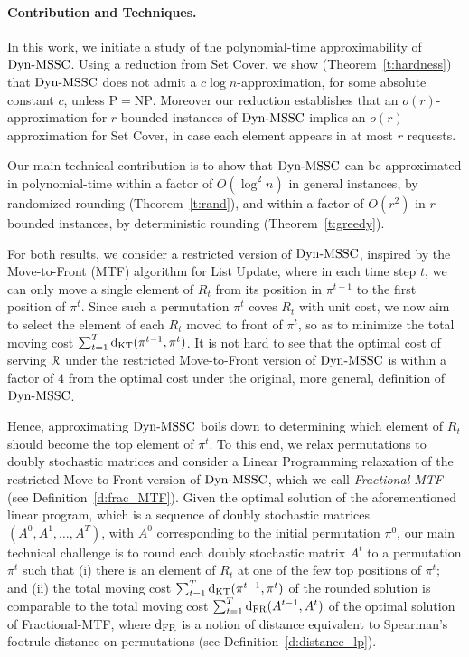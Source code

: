 \paragraph{Contribution and Techniques.}
%
In this work, we initiate a study of the polynomial-time approximability of $\mathrm{Dyn}\text{-}\mathrm{MSSC}$. Using a reduction from Set Cover, we show (Theorem~\ref{t:hardness}) that $\mathrm{Dyn}\text{-}\mathrm{MSSC}$ does not admit a $c\log n$-approximation, for some absolute constant $c$, unless $\mathrm{P}=\mathrm{NP}$. Moreover our reduction establishes that an $o(r)$-approximation for $r$-bounded instances of $\mathrm{Dyn}\text{-}\mathrm{MSSC}$ implies an $o(r)$-approximation for Set Cover, in case each element appears in at most $r$ requests. 

Our main technical contribution is to show that $\mathrm{Dyn}\text{-}\mathrm{MSSC}$ can be approximated in polynomial-time within a factor of $O(\log^2 n)$ in general instances, by randomized rounding (Theorem~\ref{t:rand}), and within a factor of $O(r^2)$ in $r$-bounded instances, by deterministic rounding (Theorem~\ref{t:greedy}). %

For both results, we consider a restricted version of $\mathrm{Dyn}\text{-}\mathrm{MSSC}$, inspired by the Move-to-Front (MTF) algorithm for List Update, where in each time step $t$, we can only move a single element of $R_t$ from its position in $\pi^{t-1}$ to the first position of $\pi^t$. Since such a permutation $\pi^t$ coves $R_t$ with unit cost, we now aim to select the element of each $R_t$ moved to front of $\pi^t$, so as to minimize the total moving cost $\sum_{t=1}^T \mathrm{d}_{\mathrm{KT}}(\pi^{t-1}, \pi^t)$. It is not hard to see that the optimal cost of serving $\mathcal{R}$ under the restricted Move-to-Front version of $\mathrm{Dyn}\text{-}\mathrm{MSSC}$ is within a factor of $4$ from the optimal cost under the original, more general, definition of $\mathrm{Dyn}\text{-}\mathrm{MSSC}$. 

Hence, approximating $\mathrm{Dyn}\text{-}\mathrm{MSSC}$ boils down to determining which element of $R_t$ should become the top element of $\pi^{t}$. To this end, we relax permutations to doubly stochastic matrices and consider a Linear Programming relaxation of the restricted Move-to-Front version of $\mathrm{Dyn}\text{-}\mathrm{MSSC}$, which we call \emph{Fractional-MTF} (see Definition~\ref{d:frac_MTF}). Given the optimal solution of the aforementioned linear program, which is a sequence of doubly stochastic matrices $(A^0, A^1, \ldots, A^T)$, with $A^0$ corresponding to the initial permutation $\pi^0$, our main technical challenge is to round each doubly stochastic matrix $A^t$ to a permutation $\pi^t$ such that (i) there is an element of $R_t$ at one of the few top positions of $\pi^t$; and (ii) the total moving cost $\sum_{t=1}^T \mathrm{d}_{\mathrm{KT}}(\pi^{t-1}, \pi^t)$ of the rounded solution is comparable to the total moving cost $\sum_{t=1}^T \mathrm{d}_{\mathrm{FR}}(A^{t-1}, A^t)$ of the optimal solution of Fractional-MTF, where $\mathrm{d}_{\mathrm{FR}}$ is a notion of distance equivalent to Spearman's footrule distance on permutations (see Definition~\ref{d:distance_lp}).  %

